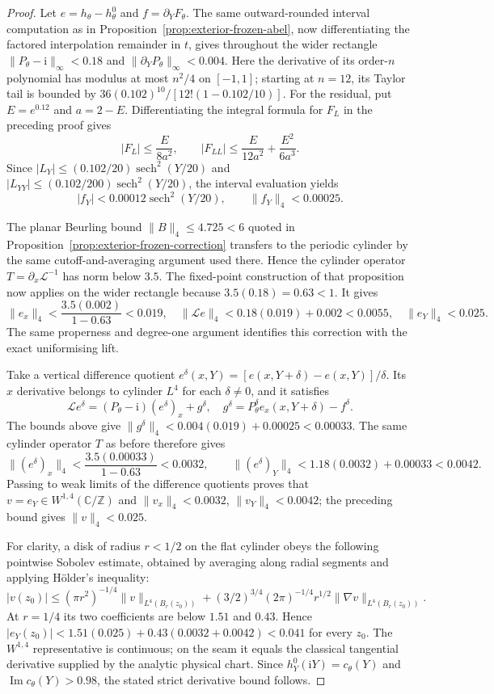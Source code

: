 \documentclass[11pt,a4paper]{article}
\theoremstyle{definition}
\newcommand{\ii}{\mathrm{i}}
\begin{document}
\begin{proof}
Let $e=h_\theta-h^0_\theta$ and $f=\partial_YF_\theta$.
The same outward-rounded interval computation as in
Proposition~\ref{prop:exterior-frozen-abel}, now differentiating
the factored interpolation remainder in $t$, gives throughout the
wider rectangle
$\|P_\theta-\ii\|_\infty<0.18$ and
$\|\partial_YP_\theta\|_\infty<0.004$.
Here the derivative of its order-$n$ polynomial has modulus at most
$n^2/4$ on $[-1,1]$; starting at $n=12$, its Taylor tail is bounded by
$36(0.102)^{10}/[12!(1-0.102/10)]$.
For the residual, put $E=e^{0.12}$ and $a=2-E$.  Differentiating
the integral formula for $F_L$ in the preceding proof gives
\[
 |F_L|\le\frac{E}{8a^2},\qquad
 |F_{LL}|\le\frac{E}{12a^2}+\frac{E^2}{6a^3}.
\]
Since $|L_Y|\le(0.102/20)\operatorname{sech}^2(Y/20)$ and
$|L_{YY}|\le(0.102/200)\operatorname{sech}^2(Y/20)$,
the interval evaluation yields
\[
 |f_Y|<0.00012\operatorname{sech}^2(Y/20),
 \qquad \|f_Y\|_4<0.00025.
\]

The planar Beurling bound $\|B\|_4\le4.725<6$ quoted in
Proposition~\ref{prop:exterior-frozen-correction} transfers to the
periodic cylinder by the same cutoff-and-averaging argument used
there.  Hence the cylinder operator
$T=\partial_x\mathcal L^{-1}$ has norm below $3.5$.
The fixed-point construction of that proposition now applies on
the wider rectangle because $3.5(0.18)=0.63<1$.  It gives
\[
 \|e_x\|_4<\frac{3.5(0.002)}{1-0.63}<0.019,
 \quad \|\mathcal Le\|_4<0.18(0.019)+0.002<0.0055,
 \quad \|e_Y\|_4<0.025.
\]
The same properness and degree-one argument identifies this
correction with the exact uniformising lift.

Take a vertical difference quotient $e^\delta(x,Y)
=[e(x,Y+\delta)-e(x,Y)]/\delta$.  Its $x$ derivative belongs
to cylinder $L^4$ for each $\delta\ne0$, and it satisfies
\[
 \mathcal Le^\delta=(P_\theta-\ii)(e^\delta)_x+g^\delta,
 \quad
 g^\delta=P_\theta^\delta e_x(x,Y+\delta)-f^\delta.
\]
The bounds above give
$\|g^\delta\|_4<0.004(0.019)+0.00025<0.00033$.
The same cylinder operator $T$ as before therefore gives
\[
 \|(e^\delta)_x\|_4
 <\frac{3.5(0.00033)}{1-0.63}<0.0032,
 \qquad
 \|(e^\delta)_Y\|_4
 <1.18(0.0032)+0.00033<0.0042.
\]
Passing to weak limits of the difference quotients proves that
$v=e_Y\in W^{1,4}(\mathbb C/\mathbb Z)$ and
$\|v_x\|_4<0.0032$, $\|v_Y\|_4<0.0042$;
the preceding bound gives $\|v\|_4<0.025$.

For clarity, a disk of radius $r<1/2$ on the flat cylinder obeys
the following pointwise Sobolev estimate, obtained by averaging
along radial segments and applying H\"older's inequality:
\[
 |v(z_0)|\le(\pi r^2)^{-1/4}\|v\|_{L^4(B_r(z_0))}
 +(3/2)^{3/4}(2\pi)^{-1/4}r^{1/2}
        \|\nabla v\|_{L^4(B_r(z_0))}.
\]
At $r=1/4$ its two coefficients are below $1.51$ and $0.43$.
Hence $|e_Y(z_0)|<1.51(0.025)+0.43(0.0032+0.0042)<0.041$
for every $z_0$.  The $W^{1,4}$ representative is continuous;
on the seam it equals the classical tangential derivative supplied
by the analytic physical chart.  Since
$h^0_Y(\ii Y)=c_\theta(Y)$ and
$\operatorname{Im}c_\theta(Y)>0.98$, the stated strict derivative
bound follows.


\end{proof}
\end{document}
